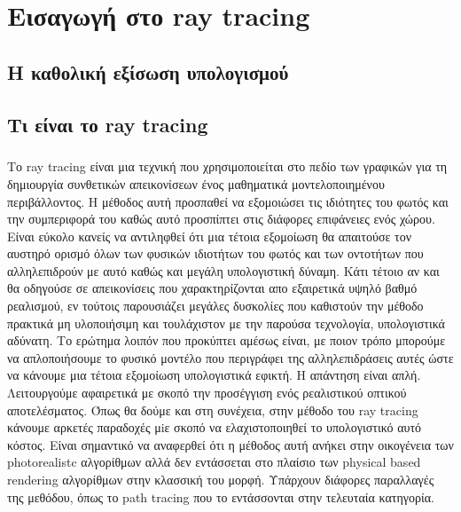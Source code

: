 \chapter{Εισαγωγή στο ray tracing}

\begin{sloppypar}

\section{H καθολική εξίσωση υπολογισμού}
\paragraph{}

\section{Τι είναι το ray tracing}
\paragraph{}
	Το ray tracing είναι μια τεχνική που χρησιμοποιείται στο πεδίο των γραφικών για τη
δημιουργία συνθετικών απεικονίσεων ένος μαθηματικά μοντελοποιημένου περιβάλλοντος. Η μέθοδος
αυτή προσπαθεί να εξομοιώσει τις ιδιότητες του φωτός και την συμπεριφορά του καθώς αυτό προσπίπτει
στις διάφορες επιφάνειες ενός χώρου. Είναι εύκολο κανείς να αντιληφθεί ότι μια τέτοια εξομοίωση θα
απαιτούσε τον αυστηρό ορισμό όλων των φυσικών ιδιοτήτων του φωτός και των οντοτήτων που αλληλεπιδρούν
με αυτό καθώς και μεγάλη υπολογιστική δύναμη. Κάτι τέτοιο αν και θα οδηγούσε σε απεικονίσεις που 
χαρακτηρίζονται απο εξαιρετικά υψηλό βαθμό ρεαλισμού, εν τούτοις παρουσιάζει μεγάλες δυσκολίες που 
καθιστούν την μέθοδο πρακτικά μη υλοποιήσιμη και τουλάχιστον με την παρούσα τεχνολογία, 
υπολογιστικά αδύνατη. Το ερώτημα λοιπόν που προκύπτει αμέσως είναι, με ποιον τρόπο μπορούμε να 
απλοποιήσουμε το φυσικό μοντέλο που περιγράφει της αλληλεπιδράσεις αυτές ώστε να κάνουμε μια τέτοια 
εξομοίωση υπολογιστικά εφικτή. Η απάντηση είναι απλή. Λειτουργούμε αφαιρετικά με σκοπό την προσέγγιση 
ενός ρεαλιστικού οπτικού αποτελέσματος. Όπως θα δούμε και στη συνέχεια, στην μέθοδο του ray tracing 
κάνουμε αρκετές παραδοχές μiε σκοπό να ελαχιστοποιηθεί το υπολογιστικό αυτό κόστος. Είναι σημαντικό να
αναφερθεί ότι η μέθοδος αυτή ανήκει στην οικογένεια των photorealistc αλγορίθμων αλλά δεν εντάσσεται 
στο πλαίσιο των physical based rendering αλγορίθμων στην κλασσική του μορφή. Υπάρχουν διάφορες 
παραλλαγές της μεθόδου, όπως το path tracing που το εντάσσονται στην τελευταία κατηγορία.


\end{sloppypar}
